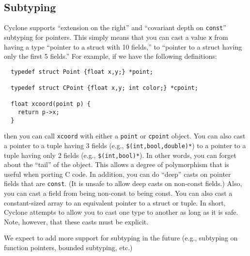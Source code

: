 \subsection{Subtyping}
Cyclone supports ``extension on the right'' and ``covariant depth on
\texttt{const}'' subtyping for pointers.  This simply means that you
can cast a value \texttt{x} from having a type ``pointer to a struct
with 10 fields,'' to ``pointer to a struct having only the first 5
fields.''  For example, if we have the following definitions:
\begin{verbatim}
  typedef struct Point {float x,y;} *point;

  typedef struct CPoint {float x,y; int color;} *cpoint;

  float xcoord(point p) {
    return p->x;
  }
\end{verbatim}
then you can call \texttt{xcoord} with either a \texttt{point} or
\texttt{cpoint} object.  You can also cast a pointer to a tuple having 3
fields (e.g., \texttt{\$(int,bool,double)*}) to a pointer to a tuple
having only 2 fields (e.g., \texttt{\$(int,bool)*}).  In other words, you
can forget about the ``tail'' of the object.  This allows a degree of
polymorphism that is useful when porting C code.  In addition, you can
do ``deep'' casts on pointer fields that are \texttt{const}.  (It is
unsafe to allow deep casts on non-const fields.)  Also, you can cast
a field from being non-const to being const.  You can also cast a
constant-sized array to an equivalent pointer to a struct or tuple.
In short, Cyclone attempts to allow you to cast one type to another as
long as it is safe.  Note, however, that these casts must be explicit.

We expect to add more support for subtyping in the future (e.g.,
subtyping on function pointers, bounded subtyping, etc.)


